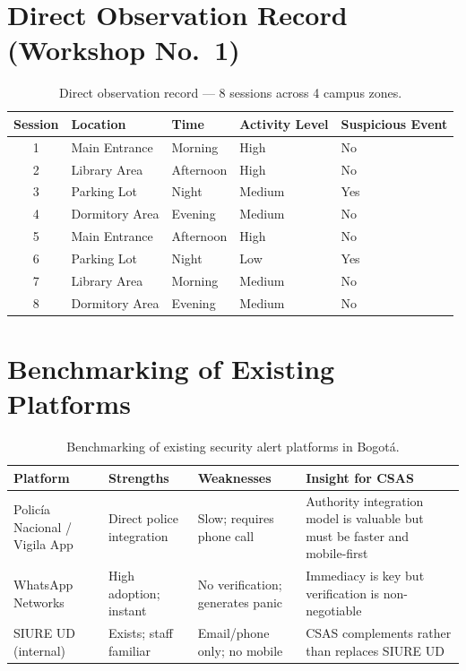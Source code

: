 \documentclass[11pt,a4paper]{article}
\begin{document}
\section{Direct Observation Record (Workshop No.\ 1)}

\begin{table}[H]
\centering
\caption{Direct observation record --- 8 sessions across 4 campus zones.}
\label{tab:observation}
\small
\begin{tabular}{c l l l l}
\toprule
\textbf{Session} & \textbf{Location} & \textbf{Time} & \textbf{Activity Level} & \textbf{Suspicious Event} \\
\midrule
1 & Main Entrance & Morning & High & No \\
2 & Library Area & Afternoon & High & No \\
3 & Parking Lot & Night & Medium & Yes \\
4 & Dormitory Area & Evening & Medium & No \\
5 & Main Entrance & Afternoon & High & No \\
6 & Parking Lot & Night & Low & Yes \\
7 & Library Area & Morning & Medium & No \\
8 & Dormitory Area & Evening & Medium & No \\
\bottomrule
\end{tabular}
\end{table}

\section{Benchmarking of Existing Platforms}

\begin{table}[H]
\centering
\caption{Benchmarking of existing security alert platforms in Bogot\'a.}
\label{tab:bench}
\small
\begin{tabularx}{\textwidth}{l l l X}
\toprule
\textbf{Platform} & \textbf{Strengths} & \textbf{Weaknesses} & \textbf{Insight for CSAS} \\
\midrule
Polic\'ia Nacional / Vigila App & Direct police integration & Slow; requires phone call & Authority integration model is valuable but must be faster and mobile-first \\
WhatsApp Networks & High adoption; instant & No verification; generates panic & Immediacy is key but verification is non-negotiable \\
SIURE UD (internal) & Exists; staff familiar & Email/phone only; no mobile & CSAS complements rather than replaces SIURE UD \\
\bottomrule
\end{tabularx}
\end{table}
\end{document}

